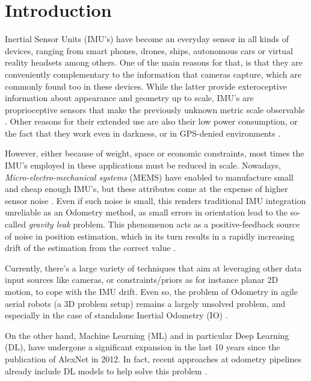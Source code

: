 \chapter{Introduction}\label{chap:introduction}

Inertial Sensor Units (IMU's) have become an everyday sensor in all kinds of devices, ranging from smart phones, drones, ships, autonomous cars or virtual reality headsets among others. 
One of the main reasons for that, is that they are conveniently complementary to the information that cameras capture, which are commonly found too in these devices. 
While the latter provide exteroceptive information about appearance and geometry up to scale, IMU's are proprioceptive sensors that make the previously unknown metric scale observable \cite{DBLP:journals/corr/ForsterCDS15}. 
Other reasons for their extended use are also their low power consumption, or the fact that they work even in darkness, or in GPS-denied environments \cite{DBLP:journals/corr/abs-1712-09004}.

However, either because of weight, space or economic constraints, most times the IMU's employed in these applications must be reduced in scale. 
Nowadays, \emph{Micro-electro-mechanical systems} (MEMS) have enabled to manufacture small and cheap enough IMU's, but these attributes come at the expense of higher sensor noise \cite{DBLP:journals/corr/abs-1802-02209}. 
Even if such noise is small, this renders traditional IMU integration unreliable as an Odometry method, as small errors in orientation lead to the so-called \emph{gravity leak} problem.
This phenomenon acts as a positive-feedback source of noise in position estimation, which in its turn results in a rapidly increasing drift of the estimation from the correct value \cite{Woodman07anintroduction}. 

Currently, there's a large variety of techniques that aim at leveraging other data input sources like cameras, or constraints/priors as for instance planar 2D motion, to cope with the IMU drift. 
Even so, the problem of Odometry in agile aerial robots (a 3D problem setup) remains a largely unsolved problem, and especially in the case of standalone Inertial Odometry (IO) \cite{DuoVIO}. 

On the other hand, Machine Learning (ML) and in particular Deep Learning (DL), have undergone a significant expansion in the last 10 years since the publication of AlexNet in 2012. 
In fact, recent approaches at odometry pipelines already include DL models to help solve this problem \cite{DBLP:journals/corr/abs-1802-02209, DBLP:journals/corr/ClarkWWMT17, DBLP:journals/corr/abs-1803-05850}.

